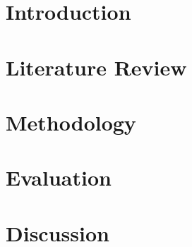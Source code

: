 \documentclass[12pt]{report}
\begin{document}


\begin{abstract}

\end{abstract}

\renewcommand{\abstractname}{Acknowledgements}
\begin{abstract}
 
\end{abstract}

\tableofcontents


\chapter{Introduction}


\chapter{Literature Review}


\chapter{Methodology}


\chapter{Evaluation}


\chapter{Discussion}





\end{document}
